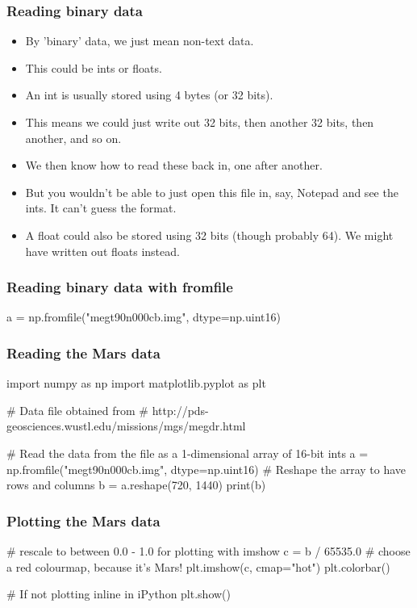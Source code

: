 \documentclass{beamer}
\begin{document}
\begin{frame}[fragile]
\frametitle{Reading binary data}
\begin{itemize}
\item By 'binary' data, we just mean non-text data. 
\item This could be ints or floats.
\item An int is usually stored using 4 bytes (or 32 bits).
\item This means we could just write out 32 bits, then another 32
  bits, then another, and so on.
\item We then know how to read these back in, one after another.
\item But you wouldn't be able to just open this file in, say, Notepad and see
  the ints. It can't guess the format.
\item A float could also be stored using 32 bits (though probably
  64). We might have written out floats instead.
\end{itemize}
\end{frame}

\begin{frame}[fragile]
\frametitle{Reading binary data with fromfile}
\begin{code}
a = np.fromfile("megt90n000cb.img", dtype=np.uint16)
\end{code}
\end{frame}

\begin{frame}[fragile]
\frametitle{Reading the Mars data}
\begin{code}
import numpy as np
import matplotlib.pyplot as plt

# Data file obtained from 
# http://pds-geosciences.wustl.edu/missions/mgs/megdr.html

# Read the data from the file as a 1-dimensional array of 16-bit ints
a = np.fromfile("megt90n000cb.img", dtype=np.uint16)
# Reshape the array to have rows and columns
b = a.reshape(720, 1440)
print(b)
\end{code}
\end{frame}


\begin{frame}[fragile]
\frametitle{Plotting the Mars data}
\begin{code}
# rescale to between 0.0 - 1.0 for plotting with imshow
c = b / 65535.0
# choose a red colourmap, because it's Mars!
plt.imshow(c, cmap="hot")
plt.colorbar()

# If not plotting inline in iPython
plt.show()
\end{code}
\end{frame}






\end{document}
